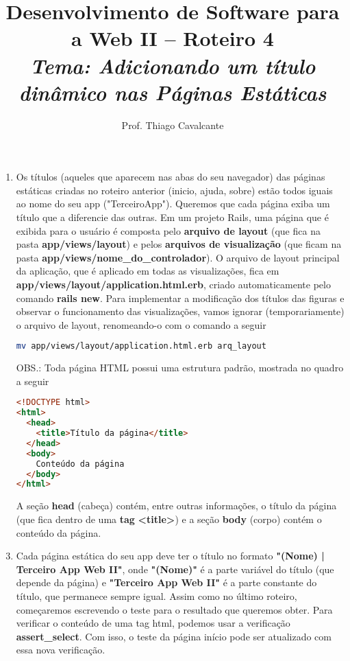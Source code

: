 \documentclass[a4paper,12pt]{article}
\title{Desenvolvimento de Software para a Web II -- Roteiro 4 \\
\Large \textit{Tema: Adicionando um título dinâmico nas Páginas Estáticas}}
\author{Prof. Thiago Cavalcante}
\date{}
\begin{document}
\maketitle

\sloppy
\raggedright

\begin{enumerate}
  \item Os títulos (aqueles que aparecem nas abas do seu navegador) das páginas estáticas criadas no roteiro anterior (inicio, ajuda, sobre) estão todos iguais ao nome do seu app ("TerceiroApp"). Queremos que cada página exiba um título que a diferencie das outras. Em um projeto Rails, uma página que é exibida para o usuário é composta pelo \textbf{arquivo de layout} (que fica na pasta \textbf{app/views/layout}) e pelos \textbf{arquivos de visualização} (que ficam na pasta \textbf{app/views/nome\_do\_controlador}). O arquivo de layout principal da aplicação, que é aplicado em todas as visualizações, fica em \textbf{app/views/layout/application.html.erb}, criado automaticamente pelo comando \textbf{rails new}. Para implementar a modificação dos títulos das figuras e observar o funcionamento das visualizações, vamos ignorar (temporariamente) o arquivo de layout, renomeando-o com o comando a seguir

  \begin{lstlisting}[language=Bash, title={terminal, dentro da pasta do terceiro app}]
mv app/views/layout/application.html.erb arq_layout
  \end{lstlisting}

  \pagebreak

  \item [OBS.:] Toda página HTML possui uma estrutura padrão, mostrada no quadro a seguir

  \begin{lstlisting}[language=html]
<!DOCTYPE html>
<html>
  <head>
    <title>Título da página</title>
  </head>
  <body>
    Conteúdo da página
  </body>
</html>
  \end{lstlisting}

  A seção \textbf{head} (cabeça) contém, entre outras informações, o título da página (que fica dentro de uma \textbf{tag} \textbf{<title>}) e a seção \textbf{body} (corpo) contém o conteúdo da página.

  \item Cada página estática do seu app deve ter o título no formato \textbf{"{}(Nome) | Terceiro App Web II"}, onde \textbf{"(Nome)"} é a parte variável do título (que depende da página) e \textbf{"Terceiro App Web II"} é a parte constante do título, que permanece sempre igual. Assim como no último roteiro, começaremos escrevendo o teste para o resultado que queremos obter. Para verificar o conteúdo de uma tag html, podemos usar a verificação \textbf{assert\_select}. Com isso, o teste da página início pode ser atualizado com essa nova verificação.


\end{enumerate}
\end{document}
